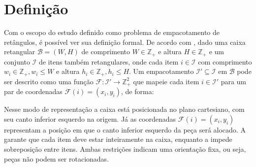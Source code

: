 \section{Definição}\label{sec:definicao}

Com o escopo do estudo definido como problema de empacotamento de retângulos, é possível ver sua
definição formal.
De acordo com , dado uma caixa retangular $\mathcal{B} = (W, H)$ de
comprimento $W \in \mathbb{Z}_+$ e altura $H \in \mathbb{Z}_+$ e um conjunto $\mathcal{I}$ de itens
também retangulares, onde cada item $i \in \mathcal{I}$ com comprimento $w_i \in \mathbb{Z}_+, w_i \le W$
e altura $h_i \in \mathbb{Z}_+, h_i \le H$.
Um empacotamento $\mathcal{I}' \subseteq \mathcal{I}$ em $\mathcal{B}$ pode ser descrito como uma função
$\mathcal{F}: \mathcal{I}' \to \mathbb{Z}_+^2$ que mapeie cada item $i \in \mathcal{I}'$ para um par
de coordenadas $\mathcal{F}(i) = (x_i, y_i)$, de forma:



Nesse modo de representação a caixa está posicionada no plano cartesiano, com seu canto inferior
esquerdo na origem.
Já as coordenadas $\mathcal{F}(i) = (x_i, y_i)$ representam a posição em que o canto inferior
esquerdo da peça será alocado.
A  garante que cada item deve estar inteiramente na caixa, enquanto a 
impede sobreposição entre itens.
Ambas restrições indicam uma orientação fixa, ou seja, peças não podem ser rotacionadas.
